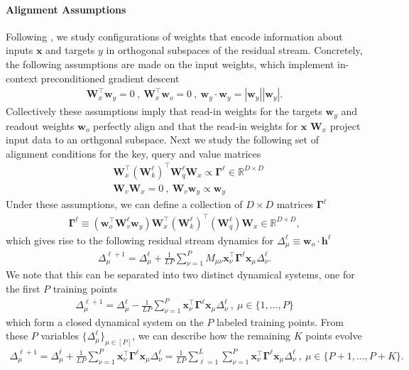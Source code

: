 \documentclass{article} %
\def\x{\bm x}
\def\w{\bm w}
\def\h{\bm h}
\begin{document}
\paragraph{Alignment Assumptions} Following \citet{von2023transformers, zhang2025trainingdynamicsincontextlearning, lu2025asymptotictheoryincontextlearning}, we study configurations of weights that encode information about inputs $\bm x$ and targets $y$ in orthogonal subspaces of the residual stream. Concretely, the following assumptions are made on the input weights, which implement in-context preconditioned gradient descent 
\begin{align}
    \bm W_x^\top \bm w_y = 0 \ , \ \bm W_x^\top \bm w_o = 0 \ , \  \bm w_y \cdot \bm w_y = |\bm w_y| |\bm w_y| .
\end{align}
Collectively these assumptions imply that read-in weights for the targets $\w_y$ and readout weights $\w_o$ perfectly align and that the read-in weights for $\x$ $\bm W_x$ project input data to an orthgonal subspace. Next we study the following set of alignment conditions for the key, query and value matrices 
\begin{align}
    &\bm W_x^\top \left(\bm W_k^\ell \right)^\top \bm W_q^\ell \bm W_x \propto \bm \Gamma^\ell  \in \mathbb{R}^{D \times D}
    \\ 
    &\bm W_v \bm W_x = 0 \ , \ \bm W_v \w_y \propto \w_y 
\end{align}
Under these assumptions, we can define a collection of $D \times D$ matrices $\bm\Gamma^\ell$
\begin{align}
    \bm\Gamma^\ell \equiv  \left( \bm w_o^\top \bm W_v^\ell \bm w_y \right)  \bm W_x^\top ( \bm W_k^\ell )^\top ( \bm W_q^\ell )  \bm W_x  \in \mathbb{R}^{D \times D } ,
\end{align}
which gives rise to the following residual stream dynamics for $\Delta_\mu^\ell \equiv \w_o \cdot \h^\ell$
\begin{align}
    \Delta^{\ell+1}_\mu = \Delta^\ell_\mu + \frac{1}{LP}\sum_{\nu=1}^P M_{\mu\nu} \x_\nu^\top \bm\Gamma^\ell \x_\mu \Delta_\nu^\ell .
\end{align}
We note that this can be separated into two distinct dynamical systems, one for the first $P$ training points 
\begin{align}
    \Delta^{\ell+1}_\mu = \Delta^\ell_\mu -\frac{1}{LP}\sum_{\nu=1}^P  \x_\nu^\top \bm\Gamma^\ell \x_\mu \Delta_\nu^\ell  \ , \ \mu \in \{1,...,P\}
\end{align}
which form a closed dynamical system on the $P$ labeled training points. From these $P$ variables $\{ \Delta_\mu^\ell \}_{\mu \in [P]}$, we can describe how the remaining $K$ points evolve
\begin{align}
    \Delta^{\ell+1}_\mu = \Delta^\ell_\mu + \frac{1}{LP}\sum_{\nu=1}^P  \x_\nu^\top \bm\Gamma^\ell \x_\mu \Delta_\nu^\ell = \frac{1}{LP} \sum_{\ell=1}^L \sum_{\nu=1}^P  \x_\nu^\top \bm\Gamma^\ell \x_\mu \Delta_\nu^\ell  \ , \ \mu \in \{P + 1,...,P+K\} .
\end{align}
\end{document}
